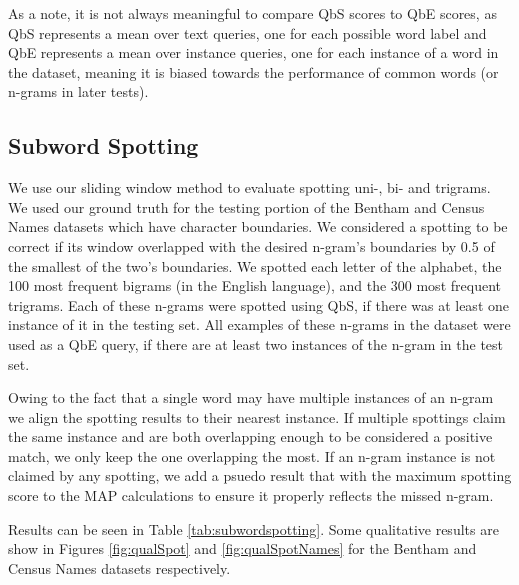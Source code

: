 \documentclass[ms,electronic,twosidetoc,letterpaper,chaptercenter,parttop,lof,lot]{byumsphd}
\begin{document}
As a note, it is not always meaningful to compare QbS scores to QbE scores, as QbS represents a mean over text queries, one for each possible word label and QbE represents a mean over instance queries, one for each instance of a word in the dataset, meaning it is biased towards the performance of common words (or n-grams in later tests).

\subsection{Subword Spotting}

We use our sliding window method to evaluate spotting uni-, bi- and trigrams. We used our ground truth for the testing portion of the Bentham and Census Names datasets which have character boundaries. We considered a spotting to be correct if its window overlapped with the desired n-gram's boundaries by 0.5 of the smallest of the two's boundaries.
We spotted each letter of the alphabet, the 100 most frequent bigrams (in the English language), and the 300 most frequent trigrams. Each of these n-grams were spotted using QbS, if there was at least one instance of it in the testing set. All examples of these n-grams in the dataset were used as a QbE query, if there are at least two instances of the n-gram in the test set.

Owing to the fact that a single word may have multiple instances of an n-gram we align the spotting results to their nearest instance. If multiple spottings claim the same instance and are both overlapping enough to be considered a positive match, we only keep the one overlapping the most.
If an n-gram instance is not claimed by any spotting, we add a psuedo result that with the maximum spotting score to the MAP calculations to ensure it properly reflects the missed n-gram.

Results can be seen in Table \ref{tab:subwordspotting}.
Some qualitative results are show in Figures \ref{fig:qualSpot} and \ref{fig:qualSpotNames} for the Bentham and Census Names datasets respectively.


\end{document}
